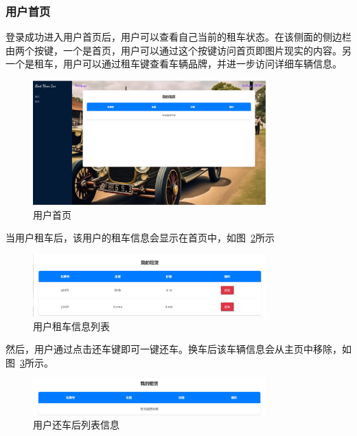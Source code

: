 \documentclass[UTF8,a4paper,12pt]{ctexart}
\begin{document}
\subsubsection{用户首页}
登录成功进入用户首页后，用户可以查看自己当前的租车状态。在该侧面的侧边栏由两个按键，一个是首页，用户可以通过这个按键访问首页即图片现实的内容。另一个是租车，用户可以通过租车键查看车辆品牌，并进一步访问详细车辆信息。
\begin{figure}[htbp]  %
    \centering  %
    \includegraphics[width=0.8\textwidth]{pic/home.png}
    \caption{用户首页}  %
    \label{fig:home}  %
\end{figure}

当用户租车后，该用户的租车信息会显示在首页中，如图~\ref{fig:rent}所示
\begin{figure}[htbp]  %
    \centering  %
    \includegraphics[width=0.8\textwidth]{pic/rent.png}
    \caption{用户租车信息列表}  %
    \label{fig:rent}  %
\end{figure}
然后，用户通过点击还车键即可一键还车。换车后该车辆信息会从主页中移除，如图~\ref{fig:afrent}所示。
\begin{figure}[htbp]  %
    \centering  %
    \includegraphics[width=0.8\textwidth]{pic/afrent.png}
    \caption{用户还车后列表信息}  %
    \label{fig:afrent}  %
\end{figure}
\end{document}
